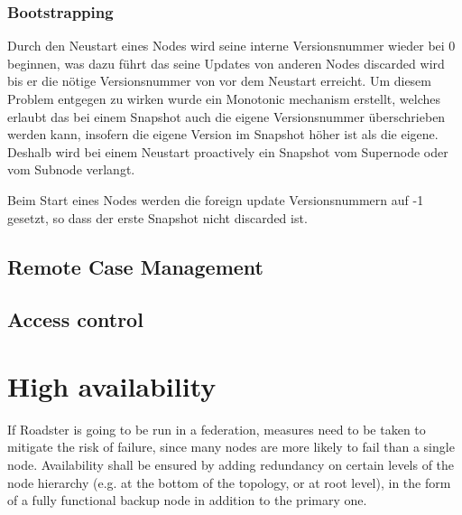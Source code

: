 \subsubsection{Bootstrapping}
Durch den Neustart eines Nodes wird seine interne Versionsnummer wieder bei 0 beginnen,
was dazu führt das seine Updates von anderen Nodes discarded wird bis er die nötige
Versionsnummer von vor dem Neustart erreicht. Um diesem Problem entgegen zu wirken
wurde ein Monotonic mechanism erstellt, welches erlaubt das bei einem Snapshot auch die
eigene Versionsnummer überschrieben werden kann, insofern die eigene Version im Snapshot höher
ist als die eigene. Deshalb wird bei einem Neustart proactively ein Snapshot vom Supernode oder
vom Subnode verlangt.

Beim Start eines Nodes werden die foreign update Versionsnummern auf -1 gesetzt, so
dass der erste Snapshot nicht discarded ist.



\subsection{Remote Case Management}


\subsection{Access control}

\section{High availability}\label{sec:approach:ha}
If Roadster is going to be run in a federation, measures need to be taken to
mitigate the risk of failure, since many nodes are more likely to fail than a
single node. Availability shall be ensured by
adding redundancy on certain levels of the node hierarchy (e.g. at the bottom
of the topology, or at root level), in the form of a
fully functional backup node in addition to the primary one.


